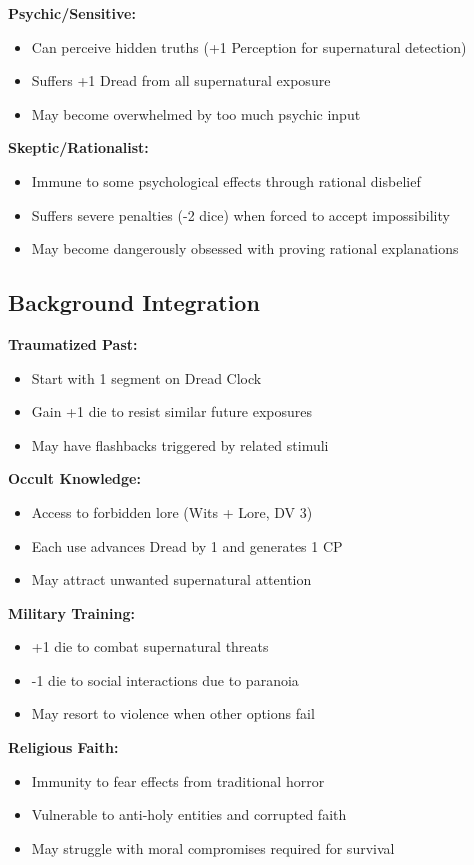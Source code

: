 \documentclass[11pt]{article}
\begin{document}
\textbf{Psychic/Sensitive:}
\begin{itemize}
\item Can perceive hidden truths (+1 Perception for supernatural detection)
\item Suffers +1 Dread from all supernatural exposure
\item May become overwhelmed by too much psychic input
\end{itemize}

\textbf{Skeptic/Rationalist:}
\begin{itemize}
\item Immune to some psychological effects through rational disbelief
\item Suffers severe penalties (-2 dice) when forced to accept impossibility
\item May become dangerously obsessed with proving rational explanations
\end{itemize}

\subsection{Background Integration}

\textbf{Traumatized Past:}
\begin{itemize}
\item Start with 1 segment on Dread Clock
\item Gain +1 die to resist similar future exposures
\item May have flashbacks triggered by related stimuli
\end{itemize}

\textbf{Occult Knowledge:}
\begin{itemize}
\item Access to forbidden lore (Wits + Lore, DV 3)
\item Each use advances Dread by 1 and generates 1 CP
\item May attract unwanted supernatural attention
\end{itemize}

\textbf{Military Training:}
\begin{itemize}
\item +1 die to combat supernatural threats
\item -1 die to social interactions due to paranoia
\item May resort to violence when other options fail
\end{itemize}

\textbf{Religious Faith:}
\begin{itemize}
\item Immunity to fear effects from traditional horror
\item Vulnerable to anti-holy entities and corrupted faith
\item May struggle with moral compromises required for survival
\end{itemize}
\end{document}
